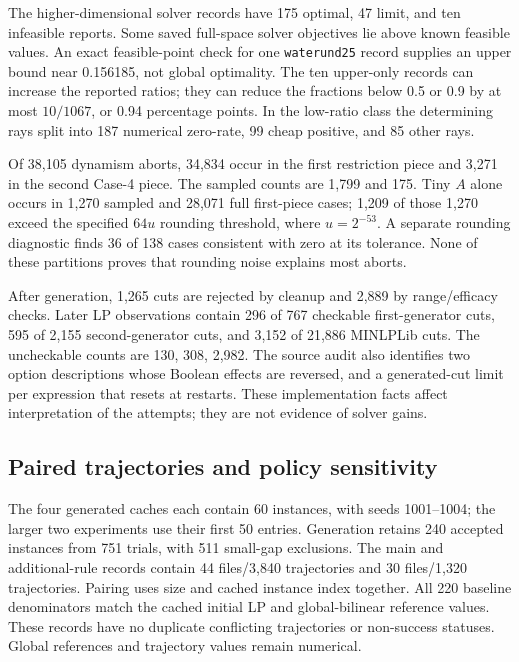 The higher-dimensional solver records have 175 optimal, 47 limit, and
ten infeasible reports. Some saved full-space solver objectives lie above
known feasible values. An exact feasible-point check for one
\texttt{waterund25} record supplies an upper bound near 0.156185,
not global optimality. The ten upper-only records can increase the
reported ratios; they can reduce the fractions below 0.5 or 0.9 by at
most $10/1067$, or 0.94 percentage points. In the low-ratio class the
determining rays split into 187 numerical zero-rate, 99 cheap positive,
and 85 other rays.

Of 38,105 dynamism aborts, 34,834 occur in the first restriction piece
and 3,271 in the second Case-4 piece. The sampled counts are 1,799 and
175. Tiny $A$ alone occurs in 1,270 sampled and 28,071 full first-piece
cases; 1,209 of those 1,270 exceed the specified $64u$ rounding threshold,
where $u=2^{-53}$. A separate rounding diagnostic finds 36 of 138 cases
consistent with zero at its tolerance. None of these partitions proves
that rounding noise explains most aborts.

After generation, 1,265 cuts are rejected by cleanup and 2,889 by
range/efficacy checks. Later LP observations contain 296 of 767 checkable
first-generator cuts, 595 of 2,155 second-generator cuts, and 3,152 of
21,886 MINLPLib cuts. The uncheckable counts are 130, 308, 2,982.
The source audit also identifies two option descriptions whose Boolean
effects are reversed, and a generated-cut limit per expression that
resets at restarts. These implementation facts affect interpretation
of the attempts; they are not evidence of solver gains.

\subsection{Paired trajectories and policy sensitivity}
\label{exp:policy-details}

The four generated caches each contain 60 instances, with seeds
1001--1004; the larger two experiments use their first 50 entries.
Generation retains 240 accepted instances from 751 trials, with 511
small-gap exclusions. The main and additional-rule records contain
44 files/3,840 trajectories and 30 files/1,320 trajectories. Pairing uses
size and cached instance index together. All 220 baseline denominators
match the cached initial LP and global-bilinear reference values.
These records have no duplicate conflicting trajectories or non-success
statuses. Global references and trajectory values remain numerical.

